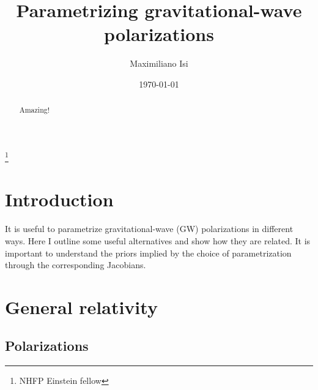 \documentclass[aps,prd,twocolumn,superscriptaddress,preprintnumbers,floatfix,nofootinbib]{revtex4-2}
\newcommand{\dcc}{LIGO-PXXXXXXX}
\begin{document}

\title{Parametrizing gravitational-wave polarizations}

\author{Maximiliano Isi}
\thanks{NHFP Einstein fellow}
%


\date{\today}

\begin{abstract}
Amazing!
\end{abstract}

\maketitle


\section{Introduction}
\label{sec:intro}

It is useful to parametrize gravitational-wave (GW) polarizations in different ways.
Here I outline some useful alternatives and show how they are related.
It is important to understand the priors implied by the choice of parametrization through the corresponding Jacobians.

\section{General relativity}

\subsection{Polarizations}
\label{sec:pol}
\end{document}
